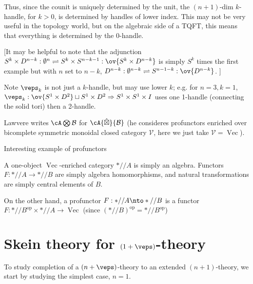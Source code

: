 \documentclass[12pt]{article}
\newcommand{\disk}[1]{{D^{#1}}}
\newcommand{\sphr}[1]{{S^{#1}}}
\newcommand{\empt}[1]{{\emptyset^{#1}}}
\newcommand{\op}{{\text{op}}}
\newcommand{\cB}{{\mathcal{B}}}
\newcommand{\hatbox}{{\hat{\boxtimes}}}
\DeclareMathOperator{\Vect}{Vec}
\begin{document}
Thus, since the counit is uniquely determined by the unit,
the $(n+1)$-dim $k$-handle, for $k > 0$,
is determined by handles of lower index.
This may not be very useful in the topology world,
but on the algebraic side of a TQFT,
this means that everything is determined by the 0-handle.



[It may be helpful to note that the adjunction
$\sphr{k} \times \disk{n-k} : \empt{n} \rightleftharpoons
	\sphr{k} \times \sphr{n-k-1} : \ov{\sphr{k} \times \disk{n-k}}$
is simply $\sphr{k}$ times
the first example but with $n$ set to $n-k$,
$\disk{n-k} : \empt{n-k} \rightleftharpoons
	\sphr{n-1-k}: \ov{\disk{n-k}}$.
]


Note $\veps_k$ is not just a $k$-handle,
but may use lower $k$;
e.g. for $n = 3, k = 1$,
$\veps_k: \ov{S^1 \times D^2} \sqcup S^1 \times D^2 \Rightarrow
S^1 \times S^1 \times I$
uses one 1-handle (connecting the solid tori)
then a 2-handle.








Lawvere \cite{Lawvere} writes $\cA \bigotimes \cB$
for $\cA \hatbox \cB$ (he consideres profunctors enriched over
bicomplete symmetric monoidal closed category $\mathcal{V}$,
here we just take $\mathcal{V} = \Vect$).

Interesting example of profunctors

\begin{example}
A one-object $\Vect$-enriched category $*//A$
is simply an algebra.
Functors $F: *//A \to *//B$ are simply algebra homomorphisms,
and natural transformations are simply central elements of $B$.

On the other hand,
a profunctor $F: *//A \nto *//B$
is a functor $F: *//B^\op \times *//A \to \Vect$
(since $(*//B)^\op = *//B^\op$)
\end{example}


\section{Skein theory for $(1+\veps)$-theory}

To study completion of a $(n+\veps)$-theory
to an extended $(n+1)$-theory,
we start by studying the simplest case, $n = 1$.
\end{document}
